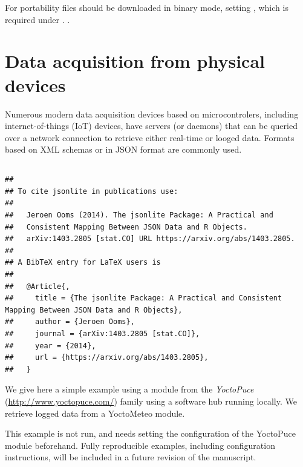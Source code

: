 \documentclass[krantz2]{krantz}\usepackage{knitr}%
\newcommand{\href}[2]{\emph{#2} (\url{#1})}
\begin{document}
\begin{warningbox}
For portability  files should be downloaded in binary mode, setting , which is required under .
.
\end{warningbox}

\section{Data acquisition from physical devices}\label{sec:data:acquisition}

Numerous modern data acquisition devices based on microcontrolers, including internet-of-things (IoT) devices, have servers (or daemons) that can be queried over a network connection to retrieve either real-time or looged data. Formats based on XML schemas or in JSON format are commonly used.

\subsection[jsonlite]{}

\begin{knitrout}\footnotesize
{}\color{fgcolor}\begin{kframe}
\begin{alltt}
\hlstd{(} \hlstd{=} \hlstd{)}
\end{alltt}
\begin{verbatim}
## 
## To cite jsonlite in publications use:
## 
##   Jeroen Ooms (2014). The jsonlite Package: A Practical and
##   Consistent Mapping Between JSON Data and R Objects.
##   arXiv:1403.2805 [stat.CO] URL https://arxiv.org/abs/1403.2805.
## 
## A BibTeX entry for LaTeX users is
## 
##   @Article{,
##     title = {The jsonlite Package: A Practical and Consistent Mapping Between JSON Data and R Objects},
##     author = {Jeroen Ooms},
##     journal = {arXiv:1403.2805 [stat.CO]},
##     year = {2014},
##     url = {https://arxiv.org/abs/1403.2805},
##   }
\end{verbatim}
\end{kframe}
\end{knitrout}

We give here a simple example using a module from the \href{http://www.yoctopuce.com/}{YoctoPuce} family using a software hub running locally. We retrieve logged data from a YoctoMeteo module.

\begin{infobox}
This example is not run, and needs setting the configuration of the YoctoPuce module beforehand. Fully reproducible examples, including configuration instructions, will be included in a future revision of the manuscript.
\end{infobox}
\end{document}
